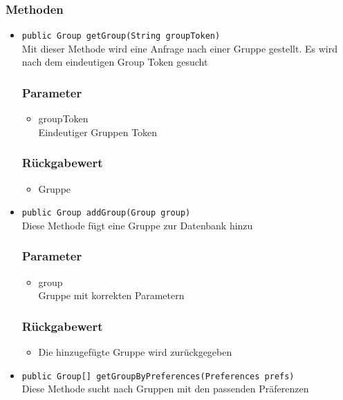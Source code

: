 \documentclass[a4paper]{scrreprt}
\begin{document}
\subsubsection*{Methoden}
\begin{addmargin}[25pt]{0pt}
\begin{itemize}

\item \texttt{public Group getGroup(String groupToken)}\\
	Mit dieser Methode wird eine Anfrage nach einer Gruppe gestellt. Es wird nach dem eindeutigen Group Token gesucht
	\subsubsection*{Parameter}
	\begin{itemize}
	\item groupToken \\
		Eindeutiger Gruppen Token
	\end{itemize}
	\subsubsection*{Rückgabewert}
	\begin{itemize}
	\item Gruppe 
	\end{itemize}
	
\item \texttt{public Group addGroup(Group group)}\\
	Diese Methode fügt eine Gruppe zur Datenbank hinzu
	\subsubsection*{Parameter}
	\begin{itemize}
	\item group \\
		Gruppe mit korrekten Parametern
	\end{itemize}
	\subsubsection*{Rückgabewert}
	\begin{itemize}
	\item Die hinzugefügte Gruppe wird zurückgegeben
	\end{itemize}
	
\item \texttt{public Group[] getGroupByPreferences(Preferences prefs)}\\
	Diese Methode sucht nach Gruppen mit den passenden Präferenzen

\end{itemize}
\end{addmargin}
\end{document}
